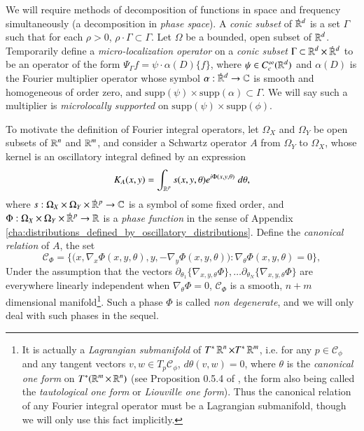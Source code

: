 We will require methods of decomposition of functions in space and frequency simultaneously (a decomposition in \emph{phase space}). A \emph{conic subset} of ${\dot{\RR}{\vphantom{\RR}}^d}$ is a set $\Gamma$ such that for each $\rho > 0$, $\rho \cdot \Gamma \subset \Gamma$. Let $\Omega$ be a bounded, open subset of $\operatorname{\mathbb{R}}^d$. Temporarily define a \emph{micro-localization operator} on a \emph{conic subset} $\Gamma \subset {\RR^d} \times {\dot{\RR}{\vphantom{\RR}}^d}$ to be an operator of the form $\Psi_\Gamma f = \psi \cdot \alpha(D) \{ f \}$, where $\psi \in C_c^\infty(\operatorname{\mathbb{R}}^d)$ and  $\alpha(D)$ is the Fourier multiplier operator whose symbol $\alpha: {\dot{\RR}{\vphantom{\RR}}^d} \to \CC$ is smooth and homogeneous of order zero, and $\text{supp}(\psi) \times \text{supp}(\alpha) \subset \Gamma$. We will say such a multiplier is \emph{microlocally supported} on $\text{supp}(\psi) \times \text{supp}(\phi)$.

To motivate the definition of Fourier integral operators, let $\Omega_X$ and $\Omega_Y$ be open subsets of $\operatorname{\mathbb{R}}^n$ and $\operatorname{\mathbb{R}}^m$, and consider a Schwartz operator $A$ from $\Omega_Y$ to $\Omega_X$, whose kernel is an oscillatory integral defined by an expression
%
\begin{equation}
  K_A(x,y) = \int_{\operatorname{\mathbb{R}}^p} s(x,y,\theta) e^{i \Phi(x,y,\theta)}\; d\theta,
\end{equation}
%
where $s: \Omega_X \times {\Omega_Y} \times {{\dot{\RR}{\vphantom{\RR}}^p}} \to \CC$ is a symbol of some fixed order, and $\Phi: \Omega_X \times \Omega_Y \times {\dot{\RR}{\vphantom{\RR}}^p} \to \RR$ is a \emph{phase function} in the sense of Appendix \ref{cha:distributions_defined_by_oscillatory_distributions}. Define the \emph{canonical relation} of $A$, the set
%
\begin{equation}
  \mathcal{C}_\Phi = \Big\{ \big(x, \nabla_x \Phi(x,y,\theta) ,y, -\nabla_y \Phi(x,y,\theta) \big) : \nabla_\theta \Phi(x,y,\theta) = 0 \Big\},
\end{equation}
%
Under the assumption that the vectors $\partial_{\theta_1} \{ \nabla_{x,y,\theta} \Phi \}, \dots \partial_{\theta_N} \{ \nabla_{x,y,\theta} \Phi \}$ are everywhere linearly independent when $\nabla_\theta \Phi = 0$, $\mathcal{C}_\Phi$ is a smooth, $n + m$ dimensional manifold\footnote{It is actually a \emph{Lagrangian submanifold} of $T^* \operatorname{\mathbb{R}}^n \times T^* \operatorname{\mathbb{R}}^m$, i.e. for any $p \in \mathcal{C}_\phi$ and any tangent vectors $v,w \in T_p \mathcal{C}_\phi$, $d\theta(v,w) = 0$, where $\theta$ is the \emph{canonical one form} on $T^*(\operatorname{\mathbb{R}}^m \times \operatorname{\mathbb{R}}^n)$ (see Proposition 0.5.4 of \cite{Sogge}, the form also being called the \emph{tautological one form} or \emph{Liouville one form}). Thus the canonical relation of any Fourier integral operator must be a Lagrangian submanifold, though we will only use this fact implicitly.}. Such a phase $\Phi$ is called \emph{non degenerate}, and we will only deal with such phases in the sequel.

